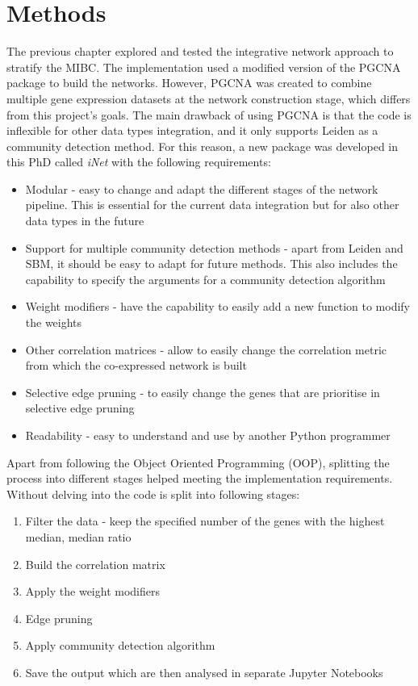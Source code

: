 \section{Methods} \label{s:N_II:methods}

The previous chapter explored and tested the integrative network approach to stratify the MIBC. The implementation used a modified version of the PGCNA package to build the networks. However, PGCNA was created to combine multiple gene expression datasets at the network construction stage, which differs from this project's goals. The main drawback of using PGCNA is that the code is inflexible for other data types integration, and it only supports Leiden as a community detection method. For this reason, a new package was developed in this PhD called \textit{iNet} with the following requirements: 

\begin{itemize}
    \item Modular - easy to change and adapt the different stages of the network pipeline. This  is essential for the current data integration but for also other data types in the future
    \item Support for multiple community detection methods - apart from Leiden and SBM, it should be easy to adapt for future methods. This also includes the capability to specify the arguments for a community detection algorithm
    \item Weight modifiers - have the capability to easily add a new function to modify the weights
    \item Other correlation matrices - allow to easily change the correlation metric from which the co-expressed network is built
    \item Selective edge pruning - to easily change the genes that are prioritise in selective edge pruning 
    \item Readability - easy to understand and use by another Python programmer
\end{itemize}

Apart from following the Object Oriented Programming (OOP), splitting the process into different stages helped meeting the implementation requirements. Without delving into the code is split into following stages:
\begin{enumerate}
    \item Filter the data - keep the specified number of the genes with the highest median, median ratio
    \item Build the correlation matrix
    \item Apply the weight modifiers
    \item Edge pruning
    \item Apply community detection algorithm
    \item Save the output which are then analysed in separate Jupyter Notebooks
\end{enumerate}

